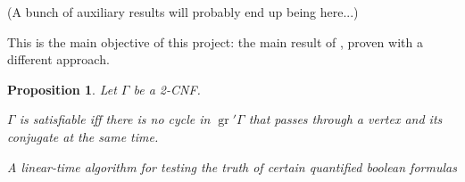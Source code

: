 \documentclass[11pt]{article}
\DeclareMathOperator{\gr}{gr}
\newtheorem{prop}{Proposition}
\begin{document}
(A bunch of auxiliary results will probably end up being here...)

This is the main objective of this project: the main result of \cite{2cnf}, proven with a different approach.

\begin{prop}
Let $\Gamma$ be a 2-CNF.

$\Gamma$ is satisfiable iff there is no cycle in $\gr' \Gamma$ that passes through a vertex and its conjugate at the same time.
\end{prop}


\begin{thebibliography}{1}

\textit{A linear-time algorithm for testing the truth of certain quantified boolean formulas}

\end{thebibliography}
\end{document}
